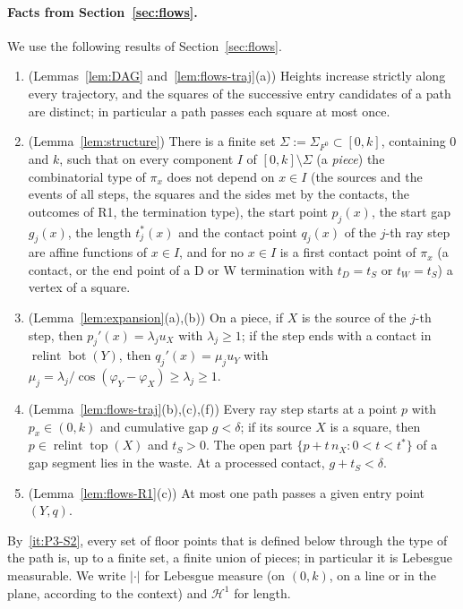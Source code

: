\documentclass[11pt]{amsart}
\newcommand{\relint}{\operatorname{relint}}
\newcommand{\Bot}{\operatorname{bot}}
\newcommand{\Top}{\operatorname{top}}
\newcommand{\Fz}{F^{0}}
\theoremstyle{definition}
\theoremstyle{remark}
\numberwithin{equation}{section}
\begin{document}
\paragraph{Facts from Section~\ref{sec:flows}.} We use the following results of Section~\ref{sec:flows}.
\begin{enumerate}[label=(S\arabic*)]
\item\label{it:P3-S1} (Lemmas~\ref{lem:DAG} and~\ref{lem:flows-traj}(a)) Heights increase strictly along every trajectory, and the squares of the successive entry candidates of a path are distinct; in particular a path passes each square at most once.
\item\label{it:P3-S2} (Lemma~\ref{lem:structure}) There is a finite set $\Sigma:=\Sigma_{\Fz}\subset[0,k]$, containing $0$ and $k$, such that on every component $I$ of $[0,k]\setminus\Sigma$ (a \emph{piece}) the combinatorial type of $\pi_x$ does not depend on $x\in I$ (the sources and the events of all steps, the squares and the sides met by the contacts, the outcomes of R1, the termination type), the start point $p_j(x)$, the start gap $g_j(x)$, the length $t^*_j(x)$ and the contact point $q_j(x)$ of the $j$-th ray step are affine functions of $x\in I$, and for no $x\in I$ is a first contact point of $\pi_x$ (a contact, or the end point of a D or W termination with $t_D=t_S$ or $t_W=t_S$) a vertex of a square.
\item\label{it:P3-S3} (Lemma~\ref{lem:expansion}(a),(b)) On a piece, if $X$ is the source of the $j$-th step, then $p_j'(x)=\lambda_j u_X$ with $\lambda_j\ge1$; if the step ends with a contact in $\relint\Bot(Y)$, then $q_j'(x)=\mu_j u_Y$ with $\mu_j=\lambda_j/\cos(\varphi_Y-\varphi_X)\ge\lambda_j\ge1$.
\item\label{it:P3-S4} (Lemma~\ref{lem:flows-traj}(b),(c),(f)) Every ray step starts at a point $p$ with $p_x\in(0,k)$ and cumulative gap $g<\delta$; if its source $X$ is a square, then $p\in\relint\Top(X)$ and $t_S>0$. The open part $\{p+t\,n_X:0<t<t^*\}$ of a gap segment lies in the waste. At a processed contact, $g+t_S<\delta$.
\item\label{it:P3-S5} (Lemma~\ref{lem:flows-R1}(c)) At most one path passes a given entry point $(Y,q)$.
\end{enumerate}
By~\ref{it:P3-S2}, every set of floor points that is defined below through the type of the path is, up to a finite set, a finite union of pieces; in particular it is Lebesgue measurable. We write $|\cdot|$ for Lebesgue measure (on $(0,k)$, on a line or in the plane, according to the context) and $\mathcal H^1$ for length.
\end{document}
